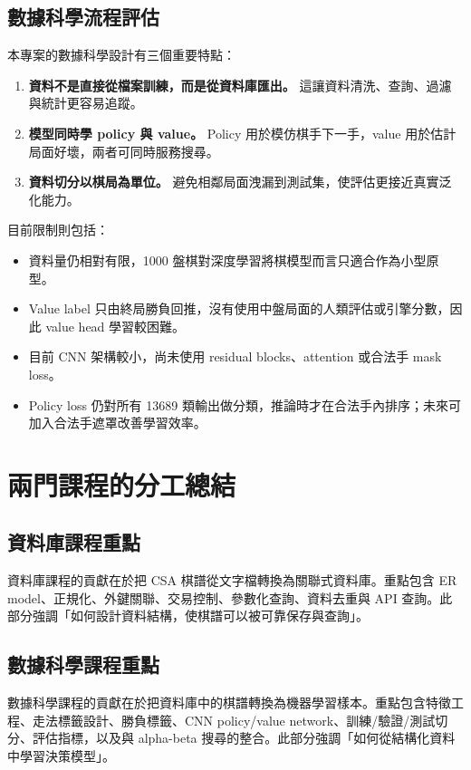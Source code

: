 \documentclass[12pt,a4paper,fontset=none]{ctexart}
\begin{document}
\subsection{數據科學流程評估}
本專案的數據科學設計有三個重要特點：

\begin{enumerate}
  \item \textbf{資料不是直接從檔案訓練，而是從資料庫匯出。} 這讓資料清洗、查詢、過濾與統計更容易追蹤。
  \item \textbf{模型同時學 policy 與 value。} Policy 用於模仿棋手下一手，value 用於估計局面好壞，兩者可同時服務搜尋。
  \item \textbf{資料切分以棋局為單位。} 避免相鄰局面洩漏到測試集，使評估更接近真實泛化能力。
\end{enumerate}

目前限制則包括：

\begin{itemize}
  \item 資料量仍相對有限，1000 盤棋對深度學習將棋模型而言只適合作為小型原型。
  \item Value label 只由終局勝負回推，沒有使用中盤局面的人類評估或引擎分數，因此 value head 學習較困難。
  \item 目前 CNN 架構較小，尚未使用 residual blocks、attention 或合法手 mask loss。
  \item Policy loss 仍對所有 13689 類輸出做分類，推論時才在合法手內排序；未來可加入合法手遮罩改善學習效率。
\end{itemize}

\section{兩門課程的分工總結}

\subsection{資料庫課程重點}
資料庫課程的貢獻在於把 CSA 棋譜從文字檔轉換為關聯式資料庫。重點包含 ER model、正規化、外鍵關聯、交易控制、參數化查詢、資料去重與 API 查詢。此部分強調「如何設計資料結構，使棋譜可以被可靠保存與查詢」。

\subsection{數據科學課程重點}
數據科學課程的貢獻在於把資料庫中的棋譜轉換為機器學習樣本。重點包含特徵工程、走法標籤設計、勝負標籤、CNN policy/value network、訓練/驗證/測試切分、評估指標，以及與 alpha-beta 搜尋的整合。此部分強調「如何從結構化資料中學習決策模型」。
\end{document}
